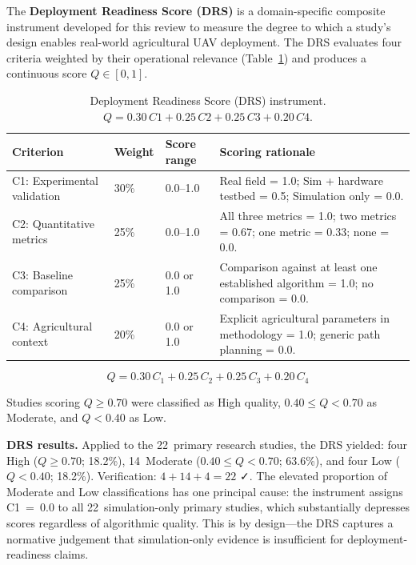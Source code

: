\documentclass[review,3p]{elsarticle}
\begin{document}
The \textbf{Deployment Readiness Score (DRS)} is a domain-specific composite
instrument developed for this review to measure the degree to which a study's
design enables real-world agricultural UAV deployment. The DRS evaluates four
criteria weighted by their operational relevance (Table~\ref{tab:quality_criteria})
and produces a continuous score $Q \in [0, 1]$.

\begin{table}[htbp]
\centering
\caption{Deployment Readiness Score (DRS) instrument. $Q = 0.30\,C1 + 0.25\,C2 + 0.25\,C3 + 0.20\,C4$.}
\label{tab:quality_criteria}
\begin{tabularx}{\textwidth}{lllX}
\toprule
\textbf{Criterion} & \textbf{Weight} & \textbf{Score range} & \textbf{Scoring rationale} \\
\midrule
C1: Experimental validation & 30\% & 0.0--1.0 & Real field = 1.0; Sim + hardware testbed = 0.5; Simulation only = 0.0. \\
C2: Quantitative metrics    & 25\% & 0.0--1.0 & All three metrics = 1.0; two metrics = 0.67; one metric = 0.33; none = 0.0. \\
C3: Baseline comparison     & 25\% & 0.0 or 1.0 & Comparison against at least one established algorithm = 1.0; no comparison = 0.0. \\
C4: Agricultural context    & 20\% & 0.0 or 1.0 & Explicit agricultural parameters in methodology = 1.0; generic path planning = 0.0. \\
\bottomrule
\end{tabularx}
\end{table}

\begin{equation}
Q = 0.30\,C_1 + 0.25\,C_2 + 0.25\,C_3 + 0.20\,C_4
\label{eq:drs}
\end{equation}

Studies scoring $Q \geq 0.70$ were classified as High quality,
$0.40 \leq Q < 0.70$ as Moderate, and $Q < 0.40$ as Low.

\textbf{DRS results.} Applied to the 22~primary research studies, the DRS
yielded: four High ($Q \geq 0.70$; 18.2\%), 14~Moderate ($0.40 \leq Q < 0.70$;
63.6\%), and four Low ($Q < 0.40$; 18.2\%). Verification: $4+14+4=22$ ✓.
The elevated proportion of Moderate and Low classifications has one principal
cause: the instrument assigns C1~=~0.0 to all 22~simulation-only primary
studies, which substantially depresses scores regardless of algorithmic quality.
This is by design---the DRS captures a normative judgement that simulation-only
evidence is insufficient for deployment-readiness claims.
\end{document}
